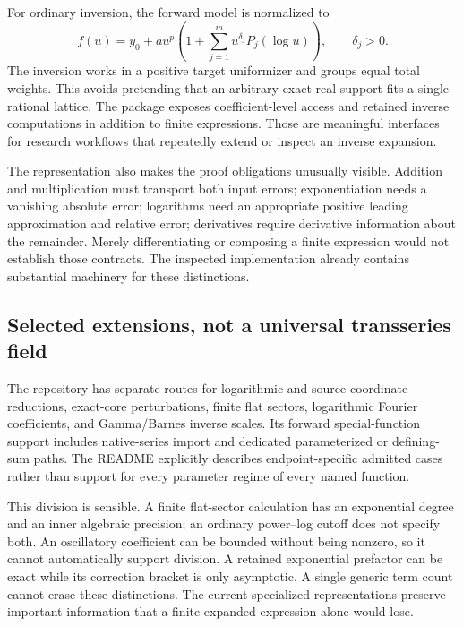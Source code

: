 \documentclass[11pt,a4paper]{article}
\begin{document}
For ordinary inversion, the forward model is normalized to
\[
 f(u)=y_0+a u^p\left(1+\sum_{j=1}^{m}u^{\delta_j}P_j(\log u)\right),
 \qquad \delta_j>0.
\]
The inversion works in a positive target uniformizer and groups equal total weights. This avoids pretending that an arbitrary exact real support fits a single rational lattice. The package exposes coefficient-level access and retained inverse computations in addition to finite expressions. Those are meaningful interfaces for research workflows that repeatedly extend or inspect an inverse expansion.\cite{repo-main,repo-operations}

The representation also makes the proof obligations unusually visible. Addition and multiplication must transport both input errors; exponentiation needs a vanishing absolute error; logarithms need an appropriate positive leading approximation and relative error; derivatives require derivative information about the remainder. Merely differentiating or composing a finite expression would not establish those contracts. The inspected implementation already contains substantial machinery for these distinctions.\cite{repo-operations,repo-envelope,repo-arithmetic}

\subsection{Selected extensions, not a universal transseries field}
The repository has separate routes for logarithmic and source-coordinate reductions, exact-core perturbations, finite flat sectors, logarithmic Fourier coefficients, and Gamma/Barnes inverse scales. Its forward special-function support includes native-series import and dedicated parameterized or defining-sum paths. The README explicitly describes endpoint-specific admitted cases rather than support for every parameter regime of every named function.\cite{repo-readme,repo-sourcecharts,repo-flat,repo-fourier,repo-native,repo-dirichlet}

This division is sensible. A finite flat-sector calculation has an exponential degree and an inner algebraic precision; an ordinary power--log cutoff does not specify both. An oscillatory coefficient can be bounded without being nonzero, so it cannot automatically support division. A retained exponential prefactor can be exact while its correction bracket is only asymptotic. A single generic term count cannot erase these distinctions. The current specialized representations preserve important information that a finite expanded expression alone would lose.\cite{repo-flat,repo-fourier,repo-native,repo-gammaforward}
\end{document}
